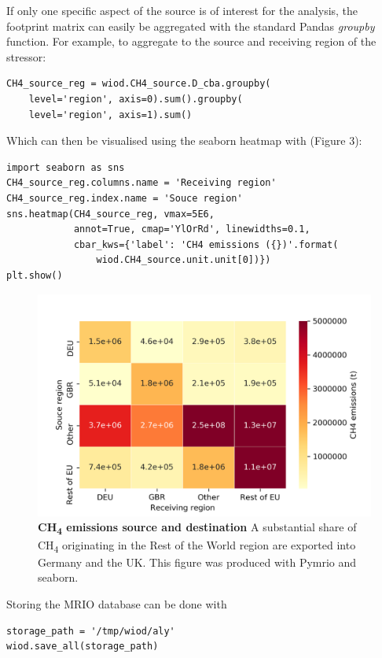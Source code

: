 \documentclass{jors}
\begin{document}
If only one specific aspect of the source is of interest for the analysis, the footprint matrix can easily be aggregated with the standard Pandas {\it groupby} function.
For example, to aggregate to the source and receiving region of the stressor:

\begin{lstlisting}
CH4_source_reg = wiod.CH4_source.D_cba.groupby(
    level='region', axis=0).sum().groupby(
    level='region', axis=1).sum()
\end{lstlisting}

Which can then be visualised using the seaborn heatmap \cite{waskom2017_mwaskom} with (Figure 3):

\begin{lstlisting}
import seaborn as sns
CH4_source_reg.columns.name = 'Receiving region'
CH4_source_reg.index.name = 'Souce region'
sns.heatmap(CH4_source_reg, vmax=5E6, 
            annot=True, cmap='YlOrRd', linewidths=0.1,
            cbar_kws={'label': 'CH4 emissions ({})'.format(
                wiod.CH4_source.unit.unit[0])})
plt.show()
\end{lstlisting}

  \begin{figure}[h!]
      \includegraphics[width=.9\textwidth]{./fig/airch4_source_reg.png}
      \caption{\textbf{CH\textsubscript{4} emissions source and destination}
      A substantial share of CH\textsubscript{4} originating in the Rest of the World region are exported into Germany and the UK.
      This figure was produced with Pymrio and seaborn. }
      \end{figure}


Storing the MRIO database can be done with 

\begin{lstlisting}
storage_path = '/tmp/wiod/aly'
wiod.save_all(storage_path)
\end{lstlisting}
\end{document}
